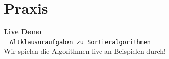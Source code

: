 \documentclass[aspectratio=169,11pt]{beamer}
\begin{document}
\section{Praxis}

\begin{frame}[plain]
    \begin{center}
        \Huge \textbf{Live Demo} \\
        \vspace{0.5cm}
        \large \faPen~ \texttt{Altklausuraufgaben zu Sortieralgorithmen} \\
        \vspace{0.3cm}
        \normalsize Wir spielen die Algorithmen live an Beispielen durch!
\vspace{0.5cm}\begin{center}\href{https://moodle.uni-ulm.de/pluginfile.php/1348606/mod_folder/content/0/2024_2_exam.pdf}{}\quad\href{https://moodle.uni-ulm.de/pluginfile.php/1348606/mod_folder/content/0/2024_1_exam.pdf}{}\quad\href{https://moodle.uni-ulm.de/pluginfile.php/1348606/mod_folder/content/0/2023_2_exam.pdf}{}\quad\href{https://moodle.uni-ulm.de/pluginfile.php/1348606/mod_folder/content/0/2023_1_exam.pdf}{}\end{center}
    \end{center}
\end{frame}
\end{document}
